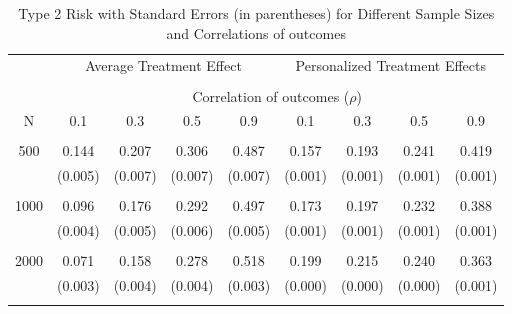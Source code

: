 \begin{table}[H]
\centering
\begin{tabular}{c||cccc|cccc}
\hline\hline
& \multicolumn{4}{c|}{Average Treatment Effect} & \multicolumn{4}{c}{Personalized Treatment Effects} \\
\cline{2-9}
\\
& \multicolumn{8}{c}{Correlation of outcomes ($\rho$)} \\
\cline{2-9}
N & 0.1 & 0.3 & 0.5 & 0.9 & 0.1 & 0.3 & 0.5 & 0.9 \\
\hline
\\
500 & 0.144 & 0.207 & 0.306 & 0.487 & 0.157 & 0.193 & 0.241 & 0.419 \\
& (0.005) & (0.007) & (0.007) & (0.007) & (0.001) & (0.001) & (0.001) & (0.001) \\
\\
1000 & 0.096 & 0.176 & 0.292 & 0.497 & 0.173 & 0.197 & 0.232 & 0.388 \\
& (0.004) & (0.005) & (0.006) & (0.005) & (0.001) & (0.001) & (0.001) & (0.001) \\
\\
2000 & 0.071 & 0.158 & 0.278 & 0.518 & 0.199 & 0.215 & 0.240 & 0.363 \\
& (0.003) & (0.004) & (0.004) & (0.003) & (0.000) & (0.000) & (0.000) & (0.001) \\
\\
\hline\hline
\end{tabular}
\caption{Type 2 Risk with Standard Errors (in parentheses) for Different Sample Sizes and Correlations of outcomes}
\label{tab:type2_risks}
\end{table}
